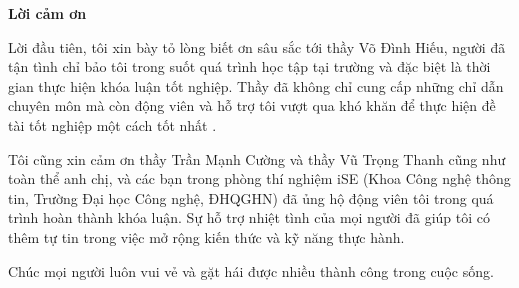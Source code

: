 \begin{center}
\textbf{\large{Lời cảm ơn}	}
\end{center}

Lời đầu tiên, tôi xin bày tỏ lòng biết ơn sâu sắc tới thầy Võ Đình Hiếu, người đã tận tình chỉ bảo tôi trong suốt quá trình học tập tại trường và đặc biệt là thời gian thực hiện khóa luận tốt nghiệp.
Thầy đã không chỉ cung cấp những chỉ dẫn chuyên môn mà còn động viên và hỗ trợ tôi vượt qua khó khăn để thực hiện đề tài tốt nghiệp một cách tốt nhất .

Tôi cũng xin cảm ơn thầy Trần Mạnh Cường và thầy Vũ Trọng Thanh cũng như toàn thể anh chị, và các bạn trong phòng thí nghiệm iSE (Khoa Công nghệ thông tin, Trường Đại học Công nghệ, ĐHQGHN) đã ủng hộ động viên tôi trong quá trình hoàn thành khóa luận.
Sự hỗ trợ nhiệt tình của mọi người đã giúp tôi có thêm tự tin trong việc mở rộng kiến thức và kỹ năng thực hành.

Chúc mọi người luôn vui vẻ và gặt hái được nhiều thành công trong cuộc sống.

